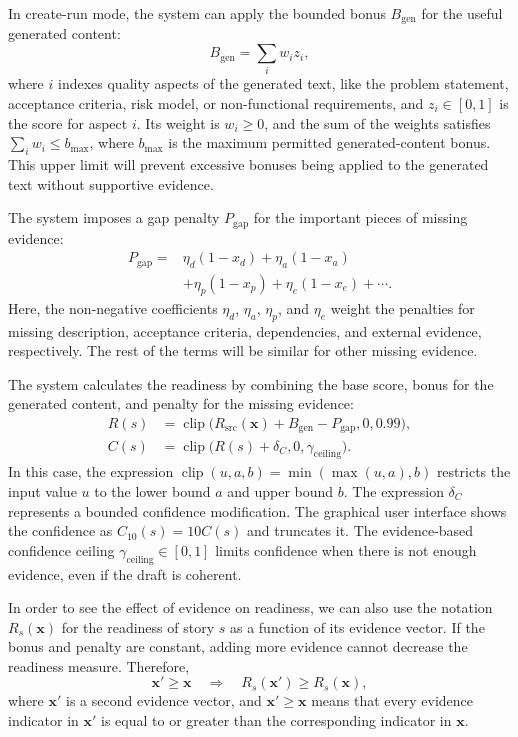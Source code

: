 \documentclass[pdflatex,sn-basic]{sn-jnl}
\begin{document}
In create-run mode, the system can apply the bounded bonus $B_{\text{gen}}$ for the useful generated content:
\begin{equation}
	B_{\text{gen}}=\sum_i w_i z_i,
\end{equation}
where $i$ indexes quality aspects of the generated text, like the problem statement, acceptance criteria, risk model, or non-functional requirements, and $z_i\in[0,1]$ is the score for aspect $i$. Its weight is $w_i\geq0$, and the sum of the weights satisfies $\sum_i w_i\leq b_{\max}$, where $b_{\max}$ is the maximum permitted generated-content bonus. This upper limit will prevent excessive bonuses being applied to the generated text without supportive evidence.

The system imposes a gap penalty $P_{\text{gap}}$ for the important pieces of missing evidence:
\begin{equation}
	\begin{aligned}
		P_{\text{gap}} ={}& \eta_d(1-x_d)+\eta_a(1-x_a) \\
		&+\eta_p(1-x_p)+\eta_e(1-x_e)+\cdots .
	\end{aligned}
\end{equation}
Here, the non-negative coefficients $\eta_d$, $\eta_a$, $\eta_p$, and $\eta_e$ weight the penalties for missing description, acceptance criteria, dependencies, and external evidence, respectively. The rest of the terms will be similar for other missing evidence.

The system calculates the readiness by combining the base score, bonus for the generated content, and penalty for the missing evidence:
\begin{align}
	R(s) &= \operatorname{clip}
	\bigl(R_{\text{src}}(\mathbf{x})+B_{\text{gen}}-P_{\text{gap}},0,0.99\bigr), \\
	C(s) &= \operatorname{clip}
	\bigl(R(s)+\delta_C,0,\gamma_{\text{ceiling}}\bigr).
\end{align}
In this case, the expression $\operatorname{clip}(u,a,b)=\min(\max(u,a),b)$ restricts the input value $u$ to the lower bound $a$ and upper bound $b$. The expression $\delta_C$ represents a bounded confidence modification. The graphical user interface shows the confidence as $C_{10}(s)=10C(s)$ and truncates it. The evidence-based confidence ceiling $\gamma_{\text{ceiling}}\in[0,1]$ limits confidence when there is not enough evidence, even if the draft is coherent.

In order to see the effect of evidence on readiness, we can also use the notation $R_s(\mathbf{x})$ for the readiness of story $s$ as a function of its evidence vector. If the bonus and penalty are constant, adding more evidence cannot decrease the readiness measure. Therefore,
\begin{equation}
	\mathbf{x}'\geq\mathbf{x}
	\quad\Rightarrow\quad
	R_s(\mathbf{x}')\geq R_s(\mathbf{x}),
\end{equation}
where $\mathbf{x}'$ is a second evidence vector, and $\mathbf{x}'\geq\mathbf{x}$ means that every evidence indicator in $\mathbf{x}'$ is equal to or greater than the corresponding indicator in $\mathbf{x}$.
\end{document}
